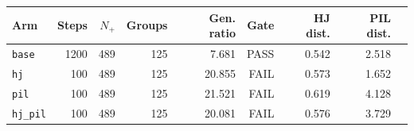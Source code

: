 \begin{tabular}{lrrrrrrrr}
\toprule
Arm & Steps & $N_+$ & Groups & Gen. ratio & Gate & HJ dist. & PIL dist. \\
\midrule
\texttt{base} & 1200 & 489 & 125 & 7.681 & PASS & 0.542 & 2.518 \\
\texttt{hj} & 100 & 489 & 125 & 20.855 & FAIL & 0.573 & 1.652 \\
\texttt{pil} & 100 & 489 & 125 & 21.521 & FAIL & 0.619 & 4.128 \\
\texttt{hj\_pil} & 100 & 489 & 125 & 20.081 & FAIL & 0.576 & 3.729 \\
\bottomrule
\end{tabular}
